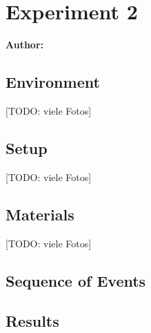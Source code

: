 \chapter{Experiment 2}

\textbf{Author: } 

\section{Environment}
[TODO: viele Fotos]

\section{Setup}
[TODO: viele Fotos]

\section{Materials}
[TODO: viele Fotos]

\section{Sequence of Events}

\section{Results}

\filbreak